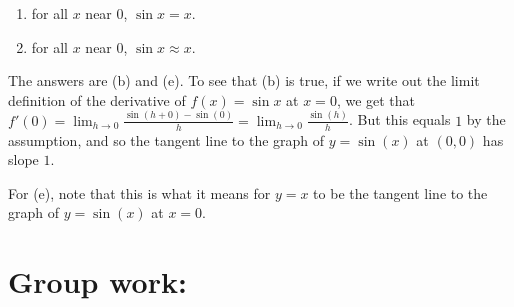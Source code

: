 \documentclass[nooutcomes]{ximera}
\begin{document}
\begin{enumerate}
\begin{enumerate}
		\item for all $x$ near $0$, $\sin x = x$.
		
		\item for all $x$ near $0$, $\sin x \approx x$.
		
		\end{enumerate} 
	
			\begin{freeResponse}
			The answers are (b) and (e).  To see that (b) is true, if we write out the limit definition of the derivative of $f(x) = \sin x$ at $x=0$, we get that 
			$f'(0) = \lim_{h \to 0} \frac{\sin (h + 0) - \sin (0)}{h}
			= \lim_{h \to 0} \frac{\sin (h)}{h}$.  
			But this equals $1$ by the assumption, and so the tangent line to the graph of $y = \sin(x)$ at $(0,0)$ has slope $1$.  
			
			For (e), note that this is what it means for $y=x$ to be the tangent line to the graph of $y = \sin(x)$ at $x=0$.
			\end{freeResponse}
		
	\end{enumerate}
	
	
	
	
	
	

\section*{Group work:}
\end{document}

